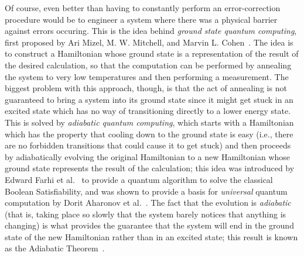 \documentclass{amsbook}
\theoremstyle{plain}
\theoremstyle{definition}
\theoremstyle{remark}
\begin{document}
Of course, even better than having to constantly perform an error-correction procedure would be to engineer a system where there was a physical barrier against errors occuring.  This is the idea behind \emph{ground state quantum computing}, first proposed by Ari Mizel, M. W. Mitchell, and Marvin L. Cohen~\cite{PhysRevA.63.040302}.  The idea is to construct a Hamiltonian whose ground state is a representation of the result of the desired calculation, so that the computation can be performed by annealing the system to very low temperatures and then performing a measurement.  The biggest problem with this approach, though, is that the act of annealing is not guaranteed to bring a system into its ground state since it might get stuck in an excited state which has no way of transitioning directly to a lower energy state.  This is solved by \emph{adiabatic quantum computing}, which starts with a Hamiltonian which has the property that cooling down to the ground state is easy (i.e., there are no forbidden transitions that could cause it to get stuck) and then proceeds by adiabatically evolving the original Hamiltonian to a new Hamiltonian whose ground state represents the result of the calculation;  this idea was introduced by Edward Farhi et al.~\cite{Farhi2000} to provide a quantum algorithm to solve the classical Boolean Satisfiability, and was shown to provide a basis for \emph{universal} quantum computation by Dorit Aharonov et al.~\cite{Aharonov2007}.  The fact that the evolution is \emph{adiabatic} (that is, taking place so slowly that the system barely notices that anything is changing) is what provides the guarantee that the system will end in the ground state of the new Hamiltonian rather than in an excited state;  this result is known as the Adiabatic Theorem~\cite{JPSJ.5.435}.
\end{document}
